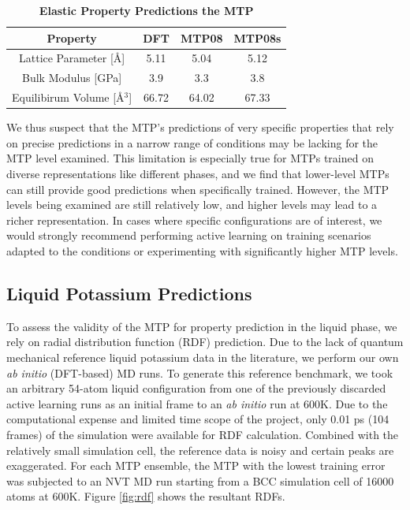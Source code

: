 \documentclass[9pt,twocolumn,twoside]{opticajnl}
\begin{document}
\begin{table}[htbp]
  \centering
  \caption{\bf Elastic Property Predictions the MTP}
  \begin{tabular}{cccc}
  \hline
  Property & DFT &  MTP08 & MTP08s\\ 
  \hline
  Lattice Parameter [Å] & 5.11 & 5.04 & 5.12\\
  Bulk Modulus [GPa]& 3.9 & 3.3 & 3.8\\
  Equilibirum Volume [Å$^3$]& 66.72 & 64.02 & 67.33\\
  \hline
  \end{tabular}
  \label{tab:elastic}
\end{table}

We thus suspect that the MTP's predictions of very specific properties that rely on precise predictions in a narrow range of conditions may be lacking for the MTP level examined. This limitation is especially true for MTPs trained on diverse representations like different phases, and we find that lower-level MTPs can still provide good predictions when specifically trained. However, the MTP levels being examined are still relatively low, and higher levels may lead to a richer representation. In cases where specific configurations are of interest, we would strongly recommend performing active learning on training scenarios adapted to the conditions or experimenting with significantly higher MTP levels.

\subsection{Liquid Potassium Predictions}
To assess the validity of the MTP for property prediction in the liquid phase, we rely on radial distribution function (RDF) prediction. Due to the lack of quantum mechanical reference liquid potassium data in the literature, we perform our own \textit{ab initio} (DFT-based) MD runs. To generate this reference benchmark, we took an arbitrary 54-atom liquid configuration from one of the previously discarded active learning runs as an initial frame to an \textit{ab initio} run at 600K. Due to the computational expense and limited time scope of the project, only 0.01 ps (104 frames) of the simulation were available for RDF calculation. Combined with the relatively small simulation cell, the reference data is noisy and certain peaks are exaggerated. For each MTP ensemble, the MTP with the lowest training error was subjected to an NVT MD run starting from a BCC simulation cell of 16000 atoms at 600K. Figure \ref{fig:rdf} shows the resultant RDFs.
\end{document}
